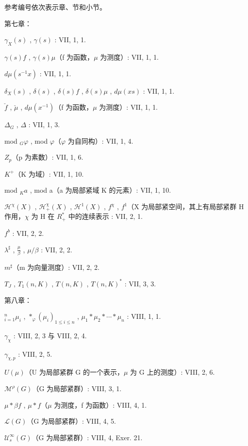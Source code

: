 
参考编号依次表示章、节和小节。

第七章：

\(\gamma_{X}(s)\) , \(\gamma(s)\) : VII, 1, 1.

\(\gamma(s)f\) , \(\gamma(s)\mu\)（f 为函数，\(\mu\) 为测度）: VII, 1, 1.

\(d\mu(s^{-1}x)\) : VII, 1, 1.

\(\delta_{X}(s)\) , \(\delta(s)\) , \(\delta(s)f\) , \(\delta(s)\mu\) , \(d\mu(xs)\) : VII, 1, 1.

\(\check{f}\) , \(\check{\mu}\) , \(d\mu(x^{-1})\)（f 为函数，\(\mu\) 为测度）: VII, 1, 1.

\(\Delta_{G}\) , \(\Delta\) : VII, 1, 3.

mod \(_{G}\varphi\) , mod \(\varphi\)（\(\varphi\) 为自同构）: VII, 1, 4.

\(Z_{p}\)（p 为素数）: VII, 1, 6.

\(K^{+}\)（K 为域）: VII, 1, 10.

mod \(_{K}a\) , mod a（a 为局部紧域 K 的元素）: VII, 1, 10.

\(\mathcal{H}^{\chi}(X)\) , \(\mathcal{H}_{+}^{\chi}(X)\) , \(\mathcal{H}^{1}(X)\) , \(f^{\chi}\) , \(f^{1}\)（X 为局部紧空间，其上有局部紧群 H 作用，\(\chi\) 为 H 在 \(R_{+}^{*}\) 中的连续表示 : VII, 2, 1.

\(f^{b}\) : VII, 2, 2.

\(\lambda^{\sharp}\) , \(\frac{\mu}{\beta}\) , \(\mu/\beta\) : VII, 2, 2.

\(m^{\sharp}\)（m 为向量测度）: VII, 2, 2.

\(T_{J}\) , \(T_{1}(n,K)\) , \(T(n,K)\) , \(T(n,K)^{*}\) : VII, 3, 3.

第八章：

\(^{n}_{i=1}\mu_{i}\) , \(*_{\varphi}(\mu_{i})_{1\leqslant i\leqslant n}\) , \(\mu_{1}*\mu_{2}*\cdots*\mu_{n}\) : VIII, 1, 1.

\(\gamma_{\chi}\) : VIII, 2, 3 与 VIII, 2, 4.

\(\gamma_{\chi,p}\) : VIII, 2, 5.

\(U(\mu)\)（U 为局部紧群 G 的一个表示，\(\mu\) 为 G 上的测度）: VIII, 2, 6.

\(\mathcal{M}^{\rho}(G)\)（G 为局部紧群）: VIII, 3, 1.

\(\mu*\beta f\) , \(\mu*f\)（\(\mu\) 为测度，f 为函数）: VIII, 4, 1.

\(\mathcal{L}(G)\)（G 为局部紧群）: VIII, 4, 5.

\(\mathcal{U}_{s}^{\infty}(G)\)（G 为局部紧群）: VIII, 4, Exer. 21.

